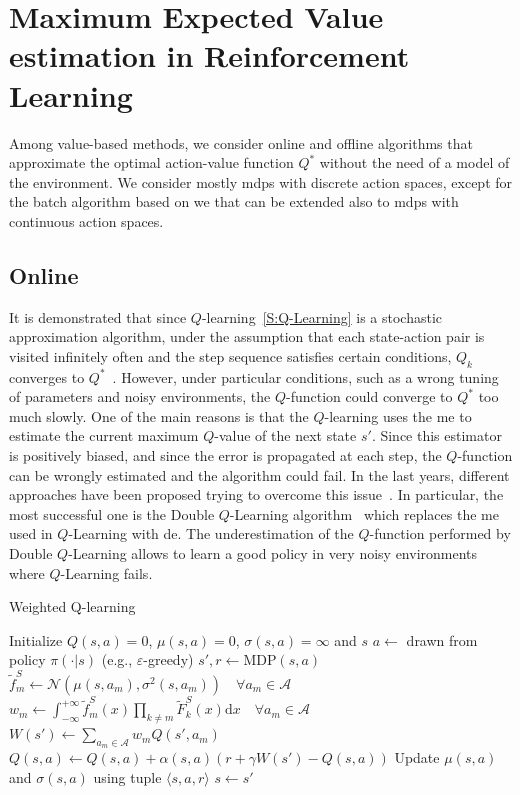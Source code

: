\section{Maximum Expected Value estimation in Reinforcement Learning}
Among value-based methods, we consider online and offline algorithms that approximate the optimal action-value function $Q^*$ without the need of a model of the environment. We consider mostly \glspl{mdp} with discrete action spaces, except for the batch algorithm based on \gls{we} that can be extended also to \glspl{mdp} with continuous action spaces.

\subsection{Online}
It is demonstrated that since $Q$-learning~\ref{S:Q-Learning} is a stochastic approximation algorithm, under the assumption that each state-action pair is visited infinitely often and the step sequence satisfies certain conditions, $Q_k$ converges to $Q^{*}$~\cite{watkins1989learning}. However, under particular conditions, such as a wrong tuning of parameters and noisy environments, the $Q$-function could converge to $Q^{*}$ too much slowly. One of the main reasons is that the $Q$-learning uses the \gls{me} to estimate the current maximum $Q$-value of the next state $s'$. Since this estimator is positively biased, and since the error is propagated at each step, the $Q$-function can be wrongly estimated and the algorithm could fail.
In the last years, different approaches have been proposed trying to overcome this issue~\cite{lee2013bias,bellemare2015increasing,ijcai2017-483}. In particular, the most successful one is the Double $Q$-Learning algorithm~\cite{van2010double} which replaces the \gls{me} used in $Q$-Learning with \gls{de}. The underestimation of the $Q$-function performed by Double $Q$-Learning allows to learn a good policy in very noisy environments where $Q$-Learning fails.

\begin{algorithm}[t]
\caption{Weighted Q-learning}
\label{A:WQ-Learning}
\begin{algorithmic}[1]
\STATE Initialize $Q(s,a) = 0$, $\mu(s,a) = 0$, $\sigma(s,a) = \infty$ and $s$
\REPEAT
\STATE $a \leftarrow$ drawn from policy $\pi(\cdot|s)$ (e.g., $\varepsilon$-greedy)
\STATE $s',r \leftarrow \text{MDP}(s,a)$
\STATE $\tilde{f}_m^S \leftarrow \mathcal{N}(\mu(s,a_m), \sigma^2(s,a_m))\quad \forall a_m \in \mathcal{A}$ 
\STATE $w_m \leftarrow \int_{-\infty}^{+\infty} \tilde{f}_m^S(x) \prod_{k\neq m} \tilde{F}^S_k(x) \mathrm{d}x \quad \forall a_m \in \mathcal{A}$
\STATE $W(s') \leftarrow \sum_{a_m \in \mathcal{A}} w_m Q(s',a_m)$
\STATE $Q(s,a) \leftarrow Q(s,a) + \alpha(s,a) (r + \gamma W(s') - Q(s,a))$
\STATE Update $\mu(s,a)$ and $\sigma(s,a)$ using tuple $\langle s,a,r \rangle$
\STATE $s \leftarrow s'$
\end{algorithmic}
\end{algorithm}

